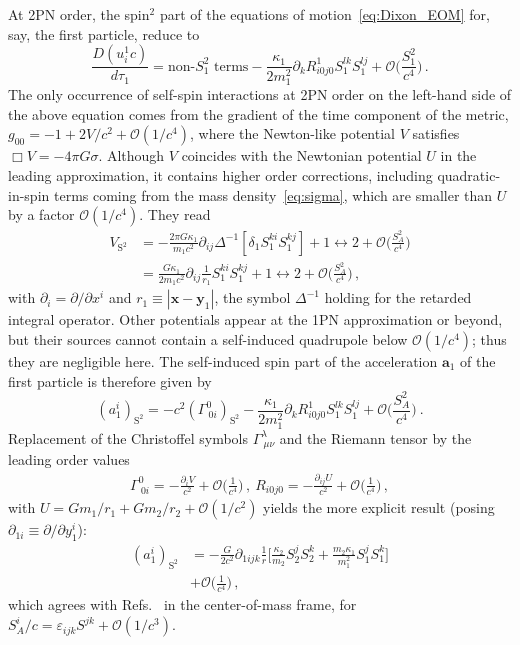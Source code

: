 \documentclass[aps, prd,
twocolumn,%
superscriptaddress,
showpacs, nofootinbib, eqsecnum, amsmath, amssymb, floatfix
]{revtex4}
\begin{document}
At 2PN order, the spin$^{2}$ part of the equations of
motion~\eqref{eq:Dixon_EOM} for, say, the first particle, reduce to
%
\begin{equation}
\frac{D(u_i^1 c)}{d\tau_1} = \text{non-}S_1^2\text{ terms}
-\frac{\kappa_1}{2m_1^2} \partial_k R^1_{i0j0} S_1^{lk} S_1^{lj} + \mathcal{O}
\Big(\frac{S_1^2}{c^4} \Big) \, .
\end{equation}
%
The only occurrence of self-spin interactions at 2PN order on the
left-hand side of the above equation comes from the gradient of the
time component of the metric, $g_{00} = -1 + 2 V/c^2 +
\mathcal{O}(1/c^4)$, where the Newton-like potential $V$ satisfies
$\Box V = - 4\pi G \sigma$. Although $V$ coincides with the
Newtonian potential $U$ in the leading approximation, it contains
higher order corrections, including quadratic-in-spin terms coming
from the mass density~\eqref{eq:sigma}, which are smaller than $U$
by a factor $\mathcal{O}(1/c^4)$. They read
%
\begin{align}
V_{\text{S}^2}  &= - \frac{2\pi G \kappa_1}{m_1 c^2} \partial_{ij} \Delta^{-1}
[\delta_1 S_1^{ki} S_1^{kj}] + 1 \leftrightarrow 2 + \mathcal{O}
\Big(\frac{S_A^2}{c^4} \Big) \nonumber \\
& =  \frac{ G \kappa_1}{2m_1 c^2} \partial_{ij} \frac{1}{r_1} S_1^{ki} S_1^{kj} + 1
\leftrightarrow 2 + \mathcal{O}  \Big(\frac{S_A^2}{c^4} \Big)\, ,
\end{align}
%
with $\partial_i = \partial/\partial x^i$ and $r_1\equiv |\bm{x}-\bm{y}_1|$,
the symbol $\Delta^{-1}$ holding for the retarded integral operator. Other
potentials appear at the 1PN approximation or beyond, but their sources cannot
contain a self-induced quadrupole below $\mathcal{O}(1/c^4)$; thus they are
negligible here. The self-induced spin part of the acceleration $\bm{a}_1$ of
the first particle is therefore given by
%
\begin{equation}
  (a^i_1)_{\text{S}^2} = -c^2 (\Gamma_{~0 i}^0)_{\text{S}^2} -
  \frac{\kappa_1}{2m_1^2} \partial_k R^1_{i0j0} S_1^{lk} S_1^{lj} +
  \mathcal{O}  \Big(\frac{S_A^2}{c^4} \Big) \ .
\end{equation}
%
Replacement of the Christoffel symbols $\Gamma_{~\mu\nu}^\lambda$ and the Riemann
tensor by the leading order values
%
\begin{align}
\Gamma_{~0 i}^0 = - \frac{\partial_i V}{c^2} +
\mathcal{O}\Big(\frac{1}{c^4}\Big) \, , ~
R_{i0j0} = - \frac{ \partial_{ij} U}{c^2} +
\mathcal{O}\Big(\frac{1}{c^4}\Big) \, ,
\end{align}
%
with $U = G m_1/r_1 + G m_2 /r_2 + \mathcal{O}(1/c^2)$ yields the more
explicit result (posing $\partial_{1i} \equiv \partial/\partial y_1^i$):
%
\begin{align}
\label{aSS}
(a^i_1)_{\text{S}^2} &= - \frac{G}{2c^2} \partial_{1ijk} \frac{1}{r} \Big[
\frac{\kappa_2}{m_2} S_2^j S_2^k + \frac{m_2 \kappa_1}{m_1^2} S_1^j S_1^k
\Big] \nonumber \\ &+ \mathcal{O} \Big( \frac{1}{c^4} \Big) \, ,
\end{align}
%
which agrees with Refs.~\cite{Poisson:1997ha,Damour01c} in the
center-of-mass frame, for $S_A^i/c = \varepsilon_{ijk} S^{jk} +
\mathcal{O}( 1/c^3)$.
\end{document}
